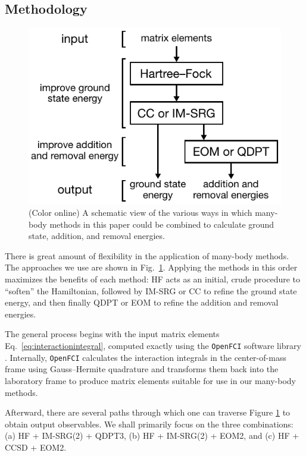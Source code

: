 \subsection{Methodology}
\label{subsec:methodology}

\begin{figure}
  \centering
  \includegraphics{figures/fig-methods.pdf}
  \caption{(Color online) A schematic view of the various ways in which many-body methods in this paper could be combined to calculate ground state, addition, and removal energies.}
  \label{fig:methods}
\end{figure}

There is great amount of flexibility in the application of many-body methods.  The approaches we use are shown in Fig.\ \ref{fig:methods}.  Applying the methods in this order maximizes the benefits of each method: HF acts as an initial, crude procedure to ``soften'' the Hamiltonian, followed by IM-SRG or CC to refine the ground state energy, and then finally QDPT or EOM to refine the addition and removal energies.

The general process begins with the input matrix elements Eq.\ \eqref{eq:interactionintegral}, computed exactly using the \texttt{OpenFCI} software library \cite{2008arXiv0810.2644K}.  Internally, \texttt{OpenFCI} calculates the interaction integrals in the center-of-mass frame using Gauss--Hermite quadrature and transforms them back into the laboratory frame to produce matrix elements suitable for use in our many-body methods.

Afterward, there are several paths through which one can traverse Figure \ref{fig:methods} to obtain output observables.  We shall primarily focus on the three combinations: (a) HF + IM-SRG(2) + QDPT3, (b) HF + IM-SRG(2) + EOM2, and (c) HF + CCSD + EOM2.


